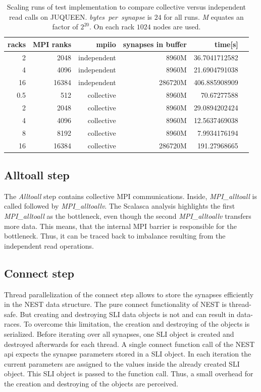\begin{table}[h!]
\begin{center}
\begin{tabular}{|r|r|r|r|r|r|}
\hline
racks & MPI ranks & mpiio & synapses in buffer & time[s] \\
\hline\hline
2  & 2048      & independent  &  8960M & 36.7041712582\\
4  & 4096      & independent  & 8960M  & 21.6904791038\\
16  & 16384      &  independent & 286720M  & 406.885908909\\
0.5  & 512      & collective  & 8960M  & 70.67277588\\
2  & 2048      & collective  & 8960M  & 29.0894202424\\
4  & 4096      & collective  & 8960M  & 12.5637469038\\
8  & 8192      & collective  &  8960M & 7.9934176194\\
16  & 16384      &  collective & 286720M  & 191.27968665\\
\hline
\end{tabular}
\end{center}
\caption[Scaling runs of test implementation to compare collective versus independent read calls on JUQUEEN]{Scaling runs of test implementation to compare collective versus independent read calls on JUQUEEN. \emph{bytes~per~synapse} is $24$ for all runs.
  \emph{M} equates an factor of $2^{20}$. On each rack $1024$ nodes are used.}
\label{schumann:tbl:indevscol}
\end{table}
\subsection{Alltoall step}
The \emph{Alltoall} step contains collective MPI communications.
Inside, \emph{MPI\_alltoall} is called followed by \emph{MPI\_alltoallv}.
The Scalasca analysis highlights the first \emph{MPI\_alltoall} as the bottleneck,
even though the second \emph{MPI\_alltoallv} transfers more data.
This means, that the internal MPI barrier is responsible for the bottleneck.
Thus, it can be traced back to imbalance resulting from the independent read operations.

\subsection{Connect step}
\label{sec:speedup:connect}
Thread parallelization of the connect step allows to store the synapses efficiently in the NEST data structure.
The pure connect functionality of NEST is thread-safe. But creating and destroying SLI data objects is not and can result
in data-races. To overcome this limitation, the creation and destroying of the objects is serialized.
Before iterating over all synapses, one SLI object is created and destroyed afterwards for each thread.
A single connect function call of the NEST api expects the synapse parameters stored in a SLI object.
In each iteration the current parameters are assigned to the values inside the already created SLI object.
This SLI object is passed to the function call.
Thus, a small overhead for the creation and destroying of the objects are perceived.

